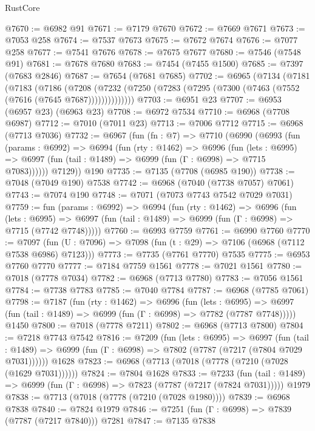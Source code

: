 \begin{lexlean}{RustCore}
\begin{coremodule}
@7670 := @6982 @91
@7671 := @7179 @7670
@7672 := @7669 @7671
@7673 := @7053 @258
@7674 := @7537 @7673
@7675 := @7672 @7674
@7676 := @7077 @258
@7677 := @7541 @7676
@7678 := @7675 @7677
@7680 := @7546 (@7548 @91)
@7681 := @7678 @7680
@7683 := @7454 (@7455 @1500)
@7685 := @7397 (@7683 @2846)
@7687 := @7654 (@7681 @7685)
@7702 := @6965
    (@7134
      (@7181
        (@7183
          (@7186
            (@7208
              (@7232 (@7250 (@7283 (@7295 (@7300 (@7463 (@7552 (@7616 (@7645 @7687))))))))))))))
@7703 := @6951 @23
@7707 := @6953 (@6957 @23) (@6963 @23)
@7708 := @6972 @7534
@7710 := @6968 (@7708 @6987)
@7712 := @7010 (@7011 @23)
@7713 := @7006 @7712
@7715 := @6968 (@7713 @7036)
@7732 := @6967
    (fun (fn : @7) =>
    @7710
      (@6990
        (@6993
          (fun (params : @6992) =>
          @6994
            (fun (rty : @1462) =>
            @6996
              (fun (lets : @6995) =>
              @6997 (fun (tail : @1489) => @6999 (fun (Γ : @6998) => @7715 @7083))))))
        @7129))
    @190
@7735 := @7135 (@7708 (@6985 @190))
@7738 := @7048 (@7049 @190) @7538
@7742 := @6968 (@7040 (@7738 @7057) @7061)
@7743 := @7074 @190
@7748 := @7071 (@7073 @7743 @7542 @7029 @7031)
@7759 := fun (params : @6992) =>
  @6994
    (fun (rty : @1462) =>
    @6996
      (fun (lets : @6995) =>
      @6997 (fun (tail : @1489) => @6999 (fun (Γ : @6998) => @7715 (@7742 @7748)))))
@7760 := @6993 @7759
@7761 := @6990 @7760
@7770 := @7097 (fun (U : @7096) => @7098 (fun (t : @29) => @7106 (@6968 (@7112 @7538 @6986) @7123)))
@7773 := @7735 (@7761 @7770) @7535
@7775 := @6953 @7760 @7770
@7777 := @7184 @7759 @1561
@7778 := @7021 @1561
@7780 := @7018 (@7778 @7034)
@7782 := @6968 (@7713 @7780)
@7783 := @7056 @1561
@7784 := @7738 @7783
@7785 := @7040 @7784
@7787 := @6968 (@7785 @7061)
@7798 := @7187
    (fun (rty : @1462) =>
    @6996
      (fun (lets : @6995) =>
      @6997 (fun (tail : @1489) => @6999 (fun (Γ : @6998) => @7782 (@7787 @7748)))))
    @1450
@7800 := @7018 (@7778 @7211)
@7802 := @6968 (@7713 @7800)
@7804 := @7218 @7743 @7542
@7816 := @7209
    (fun (lets : @6995) =>
    @6997
      (fun (tail : @1489) => @6999 (fun (Γ : @6998) => @7802 (@7787 (@7217 (@7804 @7029 @7031))))))
    @1628
@7823 := @6968 (@7713 (@7018 (@7778 (@7210 (@7028 (@1629 @7031))))))
@7824 := @7804 @1628
@7833 := @7233
    (fun (tail : @1489) => @6999 (fun (Γ : @6998) => @7823 (@7787 (@7217 (@7824 @7031)))))
    @1979
@7838 := @7713 (@7018 (@7778 (@7210 (@7028 @1980))))
@7839 := @6968 @7838
@7840 := @7824 @1979
@7846 := @7251 (fun (Γ : @6998) => @7839 (@7787 (@7217 @7840))) @7281
@7847 := @7135 @7838

\end{coremodule}
\end{lexlean}
